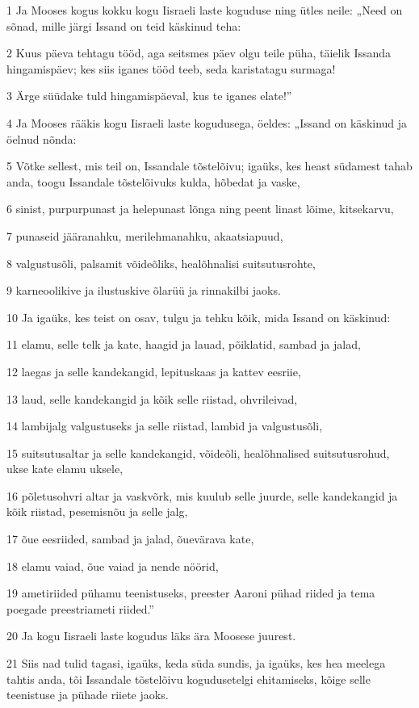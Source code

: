 \par 1 Ja Mooses kogus kokku kogu Iisraeli laste koguduse ning ütles neile: „Need on sõnad, mille järgi Issand on teid käskinud teha:
\par 2 Kuus päeva tehtagu tööd, aga seitsmes päev olgu teile püha, täielik Issanda hingamispäev; kes siis iganes tööd teeb, seda karistatagu surmaga!
\par 3 Ärge süüdake tuld hingamispäeval, kus te iganes elate!”
\par 4 Ja Mooses rääkis kogu Iisraeli laste kogudusega, öeldes: „Issand on käskinud ja öelnud nõnda:
\par 5 Võtke sellest, mis teil on, Issandale tõstelõivu; igaüks, kes heast südamest tahab anda, toogu Issandale tõstelõivuks kulda, hõbedat ja vaske,
\par 6 sinist, purpurpunast ja helepunast lõnga ning peent linast lõime, kitsekarvu,
\par 7 punaseid jääranahku, merilehmanahku, akaatsiapuud,
\par 8 valgustusõli, palsamit võideõliks, healõhnalisi suitsutusrohte,
\par 9 karneoolikive ja ilustuskive õlarüü ja rinnakilbi jaoks.
\par 10 Ja igaüks, kes teist on osav, tulgu ja tehku kõik, mida Issand on käskinud:
\par 11 elamu, selle telk ja kate, haagid ja lauad, põiklatid, sambad ja jalad,
\par 12 laegas ja selle kandekangid, lepituskaas ja kattev eesriie,
\par 13 laud, selle kandekangid ja kõik selle riistad, ohvrileivad,
\par 14 lambijalg valgustuseks ja selle riistad, lambid ja valgustusõli,
\par 15 suitsutusaltar ja selle kandekangid, võideõli, healõhnalised suitsutusrohud, ukse kate elamu uksele,
\par 16 põletusohvri altar ja vaskvõrk, mis kuulub selle juurde, selle kandekangid ja kõik riistad, pesemisnõu ja selle jalg,
\par 17 õue eesriided, sambad ja jalad, õuevärava kate,
\par 18 elamu vaiad, õue vaiad ja nende nöörid,
\par 19 ametiriided pühamu teenistuseks, preester Aaroni pühad riided ja tema poegade preestriameti riided.”
\par 20 Ja kogu Iisraeli laste kogudus läks ära Moosese juurest.
\par 21 Siis nad tulid tagasi, igaüks, keda süda sundis, ja igaüks, kes hea meelega tahtis anda, tõi Issandale tõstelõivu kogudusetelgi ehitamiseks, kõige selle teenistuse ja pühade riiete jaoks.
